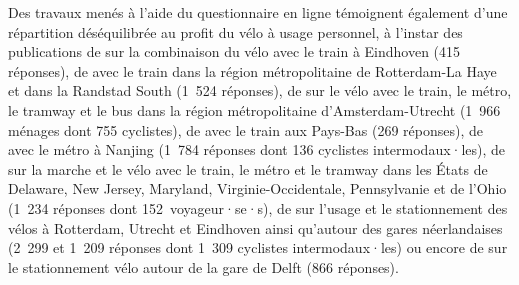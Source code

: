 \begin{refsegment}
Des travaux menés à l'aide du questionnaire en ligne témoignent également d'une répartition déséquilibrée au profit du vélo à usage personnel, à l'instar des publications de \textcolor{blue}{\textcite[724]{waerden_relation_2018}} sur la combinaison du vélo avec le train à Eindhoven (415 réponses), de \textcolor{blue}{\textcite[5, 488]{la_paix_puello_train_2016, la_paix_puello_role_2021}} avec le train dans la région métropolitaine de Rotterdam-La Haye et dans la Randstad South (1~524 réponses), de \textcolor{blue}{\textcite[267]{krygsman_multimodal_2004}} sur le vélo avec le train, le métro, le tramway et le bus dans la région métropolitaine d'Amsterdam-Utrecht
(1~966 ménages dont 755 cyclistes), de \textcolor{blue}{\textcite[663]{mil_insights_2020}} avec le train aux Pays-Bas (269 réponses), de \textcolor{blue}{\textcite[132-133]{chen_determinants_2012}} avec le métro à Nanjing (1~784 réponses dont 136 cyclistes intermodaux·les), de \textcolor{blue}{\textcite[4259]{bopp_examining_2015}} sur la marche et le vélo avec le train, le métro et le tramway dans les États de Delaware, New Jersey, Maryland, Virginie-Occidentale, Pennsylvanie et de l'Ohio (1~234 réponses dont 152~voyageur·se·s), de \textcolor{blue}{\textcite[6]{jonkeren_bicycle-train_2021, jonkeren_bicycle_2021}} sur l'usage et le stationnement des vélos à Rotterdam, Utrecht et Eindhoven ainsi qu'autour des gares néerlandaises (2~299 et 1~209 réponses dont 1~309 cyclistes intermodaux·les) ou encore de \textcolor{blue}{\textcite[6]{molin_bicycle_2015}} sur le stationnement vélo autour de la gare de Delft (866 réponses).%


\end{refsegment}
